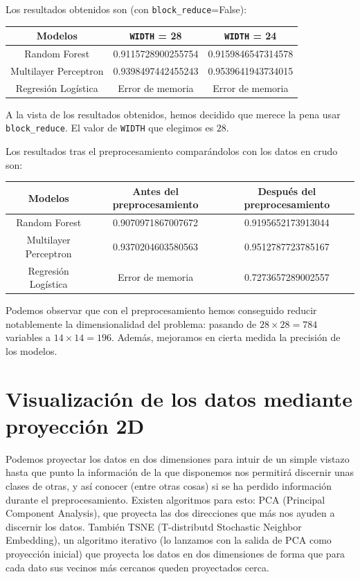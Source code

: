 \documentclass[a4]{article}
\begin{document}
Los resultados obtenidos son (con \texttt{block\_reduce}=False):

\begin{center}
\begin{tabular}{|c|c|c|}
\hline
\multicolumn{1}{|c|}{Modelos}& \textbf{\texttt{WIDTH} = 28} &
\textbf{\texttt{WIDTH} = 24}  \\ \hline
  Random Forest         & 0.9115728900255754 & 0.9159846547314578 \\
  Multilayer Perceptron & 0.9398497442455243 & 0.9539641943734015 \\
  Regresión Logística   & Error de memoria   & Error de memoria \\\hline
\end{tabular}
\end{center}

A la vista de los resultados obtenidos, hemos decidido que merece la pena usar \texttt{block\_reduce}. El valor de \texttt{WIDTH} que elegimos es $28$.

Los resultados tras el preprocesamiento comparándolos con los datos en crudo son:
\begin{center}
\begin{tabular}{|c|c|c|}
\hline
\multicolumn{1}{|c|}{Modelos}& \textbf{Antes del preprocesamiento} &
\textbf{Después del preprocesamiento}  \\ \hline
  Random Forest         & 0.9070971867007672 & 0.9195652173913044 \\
  Multilayer Perceptron & 0.9370204603580563 & 0.9512787723785167 \\
  Regresión Logística   & Error de memoria   & 0.7273657289002557 \\\hline
\end{tabular}
\end{center}

Podemos observar que con el preprocesamiento hemos conseguido reducir
notablemente la dimensionalidad del problema: pasando de
$28\times 28=784$ variables a $14\times 14=196$. Además, mejoramos en
cierta medida la precisión de los modelos.

\section{Visualización de los datos mediante proyección 2D}

Podemos proyectar los datos en dos dimensiones para intuir de un
simple vistazo hasta que punto la información de la que disponemos nos
permitirá discernir unas clases de otras, y así conocer (entre otras
cosas) si se ha perdido información durante el
preprocesamiento. Existen algoritmos para esto: PCA (Principal
Component Analysis), que proyecta las dos direcciones que más nos
ayuden a discernir los datos. También TSNE (T-distributd Stochastic
Neighbor Embedding), un algoritmo iterativo (lo lanzamos con la salida
de PCA como proyección inicial) que proyecta los datos en dos
dimensiones de forma que para cada dato sus vecinos más cercanos
queden proyectados cerca.
\end{document}
